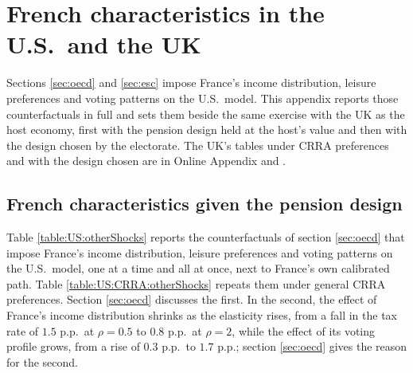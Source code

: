 \FloatBarrier
\section{French characteristics in the U.S.\ and the UK}\label{app:UKUS}\setcounter{equation}{0}
Sections \ref{sec:oecd} and \ref{sec:esc} impose France's income distribution, leisure preferences and voting patterns on the U.S.\ model. This appendix reports those counterfactuals in full and sets them beside the same exercise with the UK as the host economy, first with the pension design held at the host's value and then with the design chosen by the electorate. The UK's tables under CRRA preferences and with the design chosen are in Online Appendix  and .

\subsection{French characteristics given the pension design}\label{app:US:french}

Table \ref{table:US:otherShocks} reports the counterfactuals of section \ref{sec:oecd} that impose France's income distribution, leisure preferences and voting patterns on the U.S.\ model, one at a time and all at once, next to France's own calibrated path. Table \ref{table:US:CRRA:otherShocks} repeats them under general CRRA preferences.
Section \ref{sec:oecd} discusses the first. In the second, the effect of France's income distribution shrinks as the elasticity rises, from a fall in the tax rate of $1.5$ p.p.\ at $\rho = 0.5$ to $0.8$ p.p.\ at $\rho = 2$, while the effect of its voting profile grows, from a rise of $0.3$ p.p.\ to $1.7$ p.p.; section \ref{sec:oecd} gives the reason for the second.






